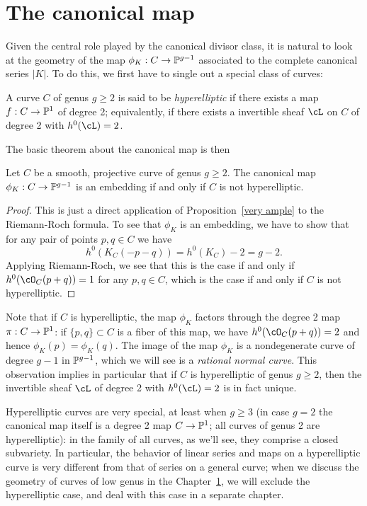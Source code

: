 \section{The canonical map}

Given the central role played by the canonical divisor class, it is natural to look at the geometry of the map $\phi_K : C \to \PP^{g-1}$ associated to the complete canonical series $|K|$. To do this, we first have to single out a special class of curves:

\begin{definition}
A curve $C$ of genus $g \geq 2$ is said to be \emph{hyperelliptic} if there exists a map $f : C \to \PP^1$ of degree 2; equivalently, if there exists a invertible sheaf $\cL$ on $C$ of degree 2 with $h^0(\cL) = 2$.
\end{definition}

The basic theorem about the canonical map is then

\begin{proposition}
Let $C$ be a smooth, projective curve of genus $g\geq 2$. The canonical map $\phi_K : C \to \PP^{g-1}$ is an embedding if and only if $C$ is not hyperelliptic.
\end{proposition}

\begin{proof}
This is just a direct application of Proposition~\ref{very ample} to the Riemann-Roch formula. To see that $\phi_K$ is an embedding, we have to show that for any pair of points $p, q \in C$ we have
$$
h^0(K_C(-p-q)) = h^0(K_C)-2 = g-2.
$$
Applying Riemann-Roch, we see that this is the case if and only if $h^0(\cO_C(p+q)) = 1$ for any $p,q \in C$, which is the case if and only if $C$ is not hyperelliptic.
\end{proof}

Note that if $C$ is hyperelliptic, the map $\phi_K$ factors through the degree 2 map $\pi : C \to \PP^1$: if $\{p,q\} \subset C$ is a fiber of this map, we have $h^0(\cO_C(p+q)) = 2$ and hence $\phi_K(p) = \phi_K(q)$. The image of the map $\phi_K$ is a nondegenerate curve of degree $g-1$ in $\PP^{g-1}$, which we will see is a \emph{rational normal curve}. This observation implies in particular that if $C$ is hyperelliptic of genus $g \geq 2$, then the invertible sheaf $\cL$ of degree 2 with $h^0(\cL) = 2$ is in fact unique.

Hyperelliptic curves are very special, at least when $g \geq 3$ (in case $g=2$ the canonical map itself is a degree 2 map $C \to \PP^1$; all curves of genus 2 are hyperelliptic): in the family of all curves, as we'll see, they comprise a closed subvariety. In particular, the behavior of linear series and maps on a hyperelliptic curve is very different from that of series on a general curve; when we discuss the geometry of curves of low genus in the Chapter~\ref{}, we will exclude  the hyperelliptic case, and deal with this case in a separate chapter.

